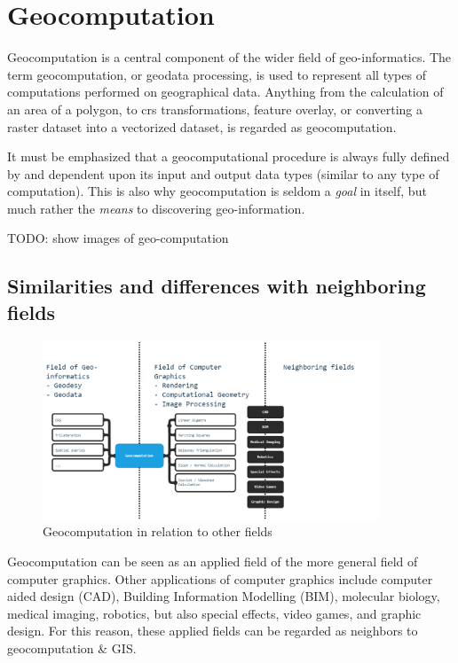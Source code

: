 \section{Geocomputation}
\label{sec:background-geo}


Geocomputation is a central component of the wider field of geo-informatics. 
The term geocomputation, or geodata processing, is used to represent all types of computations performed on geographical data. 
Anything from the calculation of an area of a polygon, to \ac{crs} transformations, feature overlay, or converting a raster dataset into a vectorized dataset, is regarded as geocomputation.

It must be emphasized that a geocomputational procedure is always fully defined by and dependent upon its input and output data types (similar to any type of computation). 
This is also why geocomputation is seldom a \emph{goal} in itself, but much rather the \emph{means} to discovering geo-information. 

\begin{note}
  TODO: show images of geo-computation
\end{note}

\subsection{Similarities and differences with neighboring fields}

\begin{figure}
  \centering
  \graphicspath{ {../../assets/diagrams/} }
  \includegraphics[width=380px]{geocomputation.png}
  \caption{Geocomputation in relation to other fields}
  \label{fig:geocomputation}
\end{figure}

Geocomputation can be seen as an applied field of the more general field of computer graphics. 
Other applications of computer graphics include computer aided design (CAD), Building Information Modelling (BIM), molecular biology, medical imaging, robotics, but also special effects, video games, and graphic design.
For this reason, these applied fields can be regarded as neighbors to geocomputation \& GIS. 

